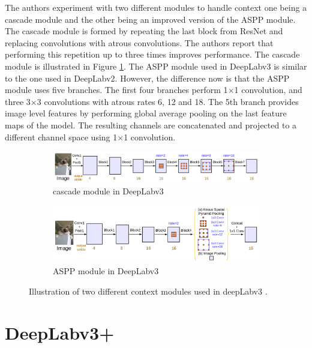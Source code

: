 The authors experiment with two different modules to handle context one being a cascade module and the other being an improved version of the ASPP module. The cascade module is formed by repeating the last block from ResNet and replacing convolutions with atrous convolutions. The authors report that performing this repetition up to three times improves performance. 	The cascade module is illustrated in Figure \ref{Fig:contextmodulea}. The ASPP module used in DeepLabv3 is similar to the one used in DeepLabv2. However, the difference now is that the ASPP module uses five branches. The first four branches perform 1$\times$1 convolution, and three 3$\times$3 convolutions with atrous rates 6, 12 and 18. The 5th branch provides image level features by performing global average pooling on the last feature maps of the model. The resulting channels are concatenated and projected to a different channel space using 1$\times$1 convolution.

	\begin{figure}
		\begin{subfigure}{1\textwidth}
			\centering
			\includegraphics[width=1\linewidth]{images/cascade_module}
			\caption{cascade module in DeepLabv3}
			\label{Fig:contextmodulea}
		\end{subfigure}
		\begin{subfigure}{1\textwidth}
			\centering
			\includegraphics[width=1\linewidth]{images/aspp_module}
			\caption{ASPP module in DeepLabv3}
			\label{Fig:contextmoduleb}
		\end{subfigure}
		\caption{Illustration of two different context modules used in deepLabv3 \cite{DBLP:journals/corr/ChenPSA17}.}
		\label{Fig:contextmodule}
	\end{figure}

\section{DeepLabv3+}

